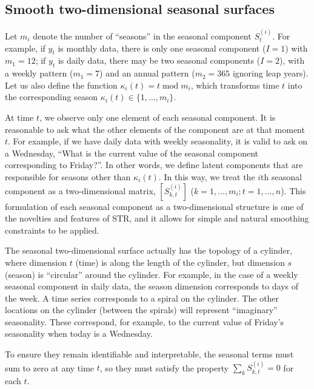 \documentclass[11pt,a4paper,]{article}
\begin{document}
\hypertarget{smooth-two-dimensional-seasonal-surfaces}{%
\subsection{Smooth two-dimensional seasonal surfaces}\label{smooth-two-dimensional-seasonal-surfaces}}

Let \(m_i\) denote the number of ``seasons'' in the seasonal component \(S^{(i)}_{t}\). For example, if \(y_t\) is monthly data, there is only one seasonal component (\(I=1\)) with \(m_1 = 12\); if \(y_t\) is daily data, there may be two seasonal components (\(I=2\)), with a weekly pattern (\(m_1=7\)) and an annual pattern (\(m_2 = 365\) ignoring leap years). Let us also define the function \(\kappa_i(t) = t\operatorname{mod}m_i\), which transforms time \(t\) into the corresponding season \(\kappa_i(t) \in \{1,\dots,m_i\}\).

At time \(t\), we observe only one element of each seasonal component. It is reasonable to ask what the other elements of the component are at that moment \(t\). For example, if we have daily data with weekly seasonality, it is valid to ask on a Wednesday, ``What is the current value of the seasonal component corresponding to Friday?''. In other words, we define latent components that are responsible for seasons other than \(\kappa_i(t)\). In this way, we treat the \(i\)th seasonal component as a two-dimensional matrix, \([S^{(i)}_{k,t}]\) (\(k=1,\dots,m_i;t=1,\dots,n\)). This formulation of each seasonal component as a two-dimensional structure is one of the novelties and features of STR, and it allows for simple and natural smoothing constraints to be applied.

The seasonal two-dimensional surface actually has the topology of a cylinder, where dimension \(t\) (time) is along the length of the cylinder, but dimension \(s\) (season) is ``circular'' around the cylinder. For example, in the case of a weekly seasonal component in daily data, the season dimension corresponds to days of the week. A time series corresponds to a spiral on the cylinder. The other locations on the cylinder (between the spirals) will represent ``imaginary'' seasonality. These correspond, for example, to the current value of Friday's seasonality when today is a Wednesday.

To ensure they remain identifiable and interpretable, the seasonal terms must sum to zero at any time \(t\), so they must satisfy the property \(\sum\limits_k S^{(i)}_{k,t} = 0\) for each \(t\).
\end{document}
